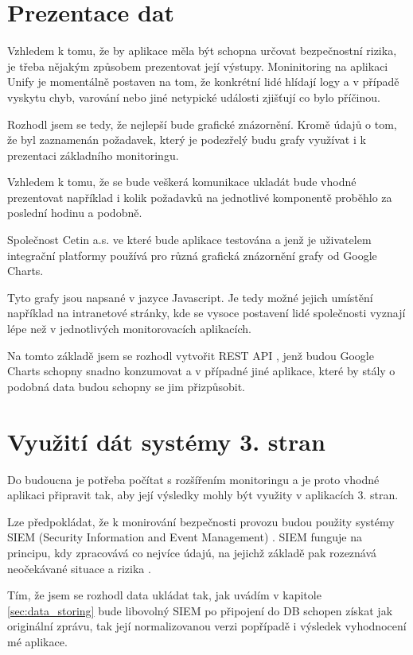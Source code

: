 \documentclass[thesis=M,czech]{FITthesis}[2012/10/20]
\begin{document}
	\section{Prezentace dat}
		\label{sec:data_prezentation}
		Vzhledem k tomu, že by aplikace měla být schopna určovat bezpečnostní rizika, je třeba nějakým způsobem prezentovat její výstupy. Moninitoring na aplikaci Unify je momentálně postaven na tom, že konkrétní lidé hlídají logy a v případě vyskytu chyb, varování nebo jiné netypické události zjišťují co bylo příčinou.
		
		Rozhodl jsem se tedy, že nejlepší bude grafické znázornění. Kromě údajů o tom, že byl zaznamenán požadavek, který je podezřelý budu grafy využívat i k prezentaci základního monitoringu. 
		
		Vzhledem k tomu, že se bude veškerá komunikace ukladát bude vhodné prezentovat například i kolik požadavků na jednotlivé komponentě proběhlo za poslední hodinu a podobně.
		
		Společnost Cetin a.s. \cite{cetin} ve které bude aplikace testována a jenž je uživatelem integrační platformy používá pro různá grafická znázornění grafy od Google Charts\cite{googleCharts}. 
		
		Tyto grafy jsou napsané v jazyce Javascript. Je tedy možné jejich umístění například na intranetové stránky, kde se vysoce postavení lidé společnosti vyznají lépe než v jednotlivých monitorovacích aplikacích.
		
		Na tomto základě jsem se rozhodl vytvořit REST API \cite{rest}, jenž budou Google Charts schopny snadno konzumovat a v případné jiné aplikace, které by stály o podobná data budou schopny se jim přizpůsobit.
		
	\section{Využití dát systémy 3. stran}
		Do budoucna je potřeba počítat s rozšířením monitoringu a je proto vhodné aplikaci připravit tak, aby její výsledky mohly být využity v aplikacích 3. stran.
		
		Lze předpokládat, že k monirování bezpečnosti provozu budou použity systémy SIEM (Security Information and Event Management) \cite{siem}.
		SIEM funguje na principu, kdy zpracovává co nejvíce údajú, na jejichž základě pak rozeznává neočekávané situace a rizika \cite{howDesSiemWork}.
		
		Tím, že jsem se rozhodl data ukládat tak, jak uvádím v kapitole \ref{sec:data_storing} bude libovolný SIEM po připojení do DB schopen získat jak originální zprávu, tak její normalizovanou verzi popřípadě i výsledek vyhodnocení mé aplikace.
		
\end{document}
